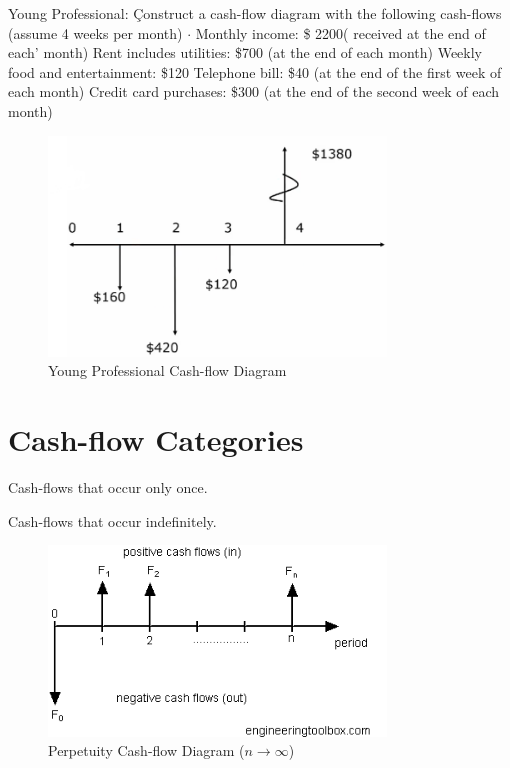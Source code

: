 \begin{example}
    Young Professional: Çonstruct a cash-flow diagram with the
    following cash-flows (assume 4 weeks per month)
    $\cdot$ Monthly income:  \$ 2200( received at the end of each' month)
    Rent includes utilities: \$700 (at the end of each month)
    Weekly food and entertainment: \$120
    Telephone bill: \$40 (at the end of the first week of each month)
    Credit card purchases: \$300 (at the end of the second week of each
    month)
    \begin{figure}[H]
        \centering
        \includegraphics[width=0.8\textwidth]{LECTURE_2/cash-flow-ex.png}
        \caption{Young Professional Cash-flow Diagram}
        \label{fig:young_professional_cash-flow}
    \end{figure}
\end{example}

\section{Cash-flow Categories}

\begin{definition}
    Cash-flows that occur only once.
\end{definition}

\begin{definition}
    [Perpetuity]
    Cash-flows that occur indefinitely.
\end{definition}
\begin{figure}[H]
    \centering
    \includegraphics[width=0.8\textwidth]{LECTURE_2/perpetuity.png}
    \caption{Perpetuity Cash-flow Diagram ($n \to \infty$)}

\end{figure}

